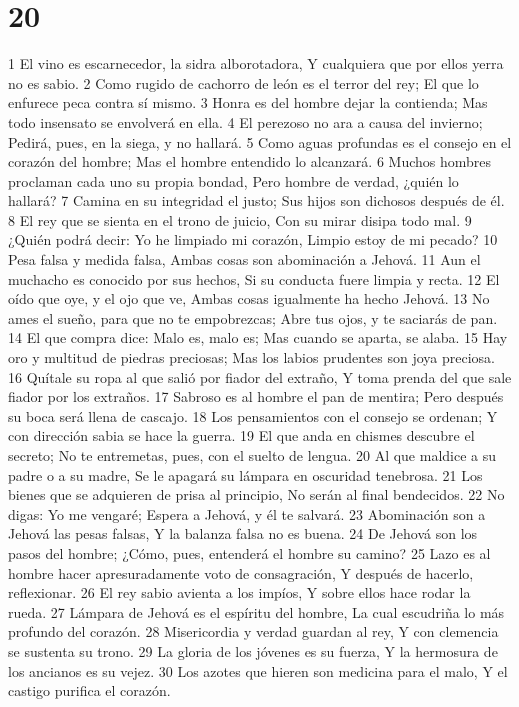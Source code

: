 \chapter{20}

1 El vino es escarnecedor, la sidra alborotadora,
Y cualquiera que por ellos yerra no es sabio.
2 Como rugido de cachorro de león es el terror del rey;
El que lo enfurece peca contra sí mismo.
3 Honra es del hombre dejar la contienda;
Mas todo insensato se envolverá en ella.
4 El perezoso no ara a causa del invierno;
Pedirá, pues, en la siega, y no hallará.
5 Como aguas profundas es el consejo en el corazón del hombre;
Mas el hombre entendido lo alcanzará.
6 Muchos hombres proclaman cada uno su propia bondad,
Pero hombre de verdad, ¿quién lo hallará?
7 Camina en su integridad el justo;
Sus hijos son dichosos después de él.
8 El rey que se sienta en el trono de juicio,
Con su mirar disipa todo mal.
9 ¿Quién podrá decir: Yo he limpiado mi corazón,
Limpio estoy de mi pecado?
10 Pesa falsa y medida falsa,
Ambas cosas son abominación a Jehová.
11 Aun el muchacho es conocido por sus hechos,
Si su conducta fuere limpia y recta.
12 El oído que oye, y el ojo que ve,
Ambas cosas igualmente ha hecho Jehová.
13 No ames el sueño, para que no te empobrezcas;
Abre tus ojos, y te saciarás de pan.
14 El que compra dice: Malo es, malo es;
Mas cuando se aparta, se alaba.
15 Hay oro y multitud de piedras preciosas;
Mas los labios prudentes son joya preciosa.
16 Quítale su ropa al que salió por fiador del extraño,
Y toma prenda del que sale fiador por los extraños.
17 Sabroso es al hombre el pan de mentira;
Pero después su boca será llena de cascajo.
18 Los pensamientos con el consejo se ordenan;
Y con dirección sabia se hace la guerra.
19 El que anda en chismes descubre el secreto;
No te entremetas, pues, con el suelto de lengua.
20 Al que maldice a su padre o a su madre,
Se le apagará su lámpara en oscuridad tenebrosa.
21 Los bienes que se adquieren de prisa al principio, 
No serán al final bendecidos.
22 No digas: Yo me vengaré;
Espera a Jehová, y él te salvará.
23 Abominación son a Jehová las pesas falsas,
Y la balanza falsa no es buena.
24 De Jehová son los pasos del hombre;
¿Cómo, pues, entenderá el hombre su camino?
25 Lazo es al hombre hacer apresuradamente voto de consagración,
Y después de hacerlo, reflexionar.
26 El rey sabio avienta a los impíos,
Y sobre ellos hace rodar la rueda.
27 Lámpara de Jehová es el espíritu del hombre,
La cual escudriña lo más profundo del corazón.
28 Misericordia y verdad guardan al rey,
Y con clemencia se sustenta su trono.
29 La gloria de los jóvenes es su fuerza,
Y la hermosura de los ancianos es su vejez.
30 Los azotes que hieren son medicina para el malo,
Y el castigo purifica el corazón.

